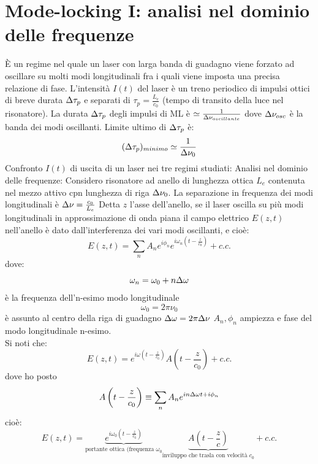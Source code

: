 \section{Mode-locking I: analisi nel dominio delle frequenze}
È un regime nel quale un laser con larga banda di guadagno viene forzato ad oscillare su molti modi longitudinali fra i quali viene imposta una precisa relazione di fase. L'intensità $I(t)$ del laser è un treno periodico di impulsi ottici di breve durata $\Delta\tau_p$ e separati di $\tau_p = \frac{L_e}{c_0}$ (tempo di transito della luce nel risonatore). La durata $\Delta\tau_p$ degli impulsi di ML è $\simeq \frac{1}{\Delta\nu_{oscillante}}$ dove $\Delta\nu_{osc}$ è la banda dei modi oscillanti. Limite ultimo di $\Delta\tau_p$ è:
\begin{equation*}
(\Delta\tau_p)_{minimo} \simeq \frac{1}{\Delta\nu_0}
\end{equation*}
Confronto $I(t)$ di uscita di un laser nei tre regimi studiati:
Analisi nel dominio delle frequenze:
Considero risonatore ad anello di lunghezza ottica $L_e$ contenuta nel mezzo attivo cpn lunghezza di riga $\Delta\nu_0$. La separazione in frequenza dei modi longitudinali è $\Delta\nu = \frac{c_0}{L_e}$
Detta $z$ l'asse dell'anello, se il laser oscilla su più modi longitudinali in approssimazione di onda piana il campo elettrico $E(z,t)$ nell'anello è dato dall'interferenza dei vari modi oscillanti, e cioè:
\begin{equation*}
E(z,t) = \sum_n A_n e^{i\phi_n} e^{i\omega_n (t-\frac{z}{c_0})} + c.c.
\end{equation*}
dove:
\begin{equation*}
\omega_n = \omega_0 + n \Delta\omega
\end{equation*}
è la frequenza dell'n-esimo modo longitudinale
\begin{equation*}
\omega_0 = 2\pi \nu_0
\end{equation*}
è assunto al centro della riga di guadagno $\Delta\omega = 2\pi\Delta\nu$
$A_n, \phi_n$ ampiezza e fase del modo longitudinale n-esimo.\\
Si noti che:
\begin{equation*}
E(z,t) = e^{i\omega \left(t-\frac{z}{c_0}\right)} A\left(t - \frac{z}{c_0}\right) + c.c.
\end{equation*}
dove ho posto
\begin{equation*}
A\left(t - \frac{z}{c_0}\right) \equiv \sum_n A_n e^{in\Delta\omega t + i\phi_n}
\end{equation*}
cioè:
\begin{equation*}
E(z,t) = \underbrace{e^{i\omega_0\left(t-\frac{z}{c_0}\right)}}_\text{portante ottica (frequenza $\omega_0$} \underbrace{A{\left(t - \frac{z}{c}\right)}}_\text{inviluppo che trasla con velocità $c_0$} + c.c.
\end{equation*}
